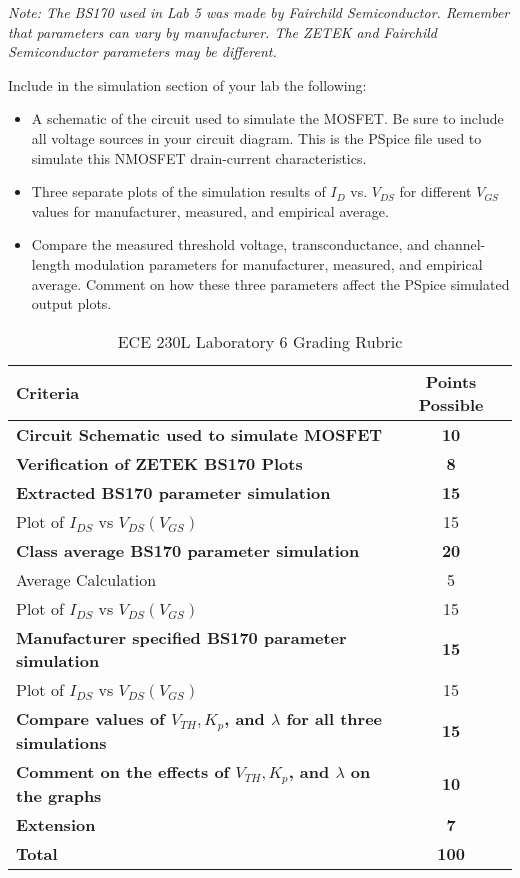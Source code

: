 \documentclass[12pt]{../manual}
\begin{document}
\textit{Note: The BS170 used in Lab 5 was made by Fairchild Semiconductor. Remember that parameters can vary by manufacturer. The ZETEK and Fairchild Semiconductor parameters may be different.}

Include in the simulation section of your lab the following:
\begin{itemize}
\item A schematic of the circuit used to simulate the MOSFET. Be sure to include all voltage sources in your circuit diagram. This is the PSpice file used to simulate this NMOSFET drain-current characteristics.
\item Three separate plots of the simulation results of $I_D$ vs. $V_{DS}$ for different $V_{GS}$ values for manufacturer, measured, and empirical average.
\item Compare the measured threshold voltage, transconductance, and channel-length modulation parameters for manufacturer, measured, and empirical average. Comment on how these three parameters affect the PSpice simulated output plots.
\end{itemize}

%
\newpage
\def\arraystretch{1.2}
{}
\hspace{0pt}
\vfill %
\begin{table}[ht!]
\caption{ECE 230L Laboratory 6 Grading Rubric}
\centering
\begin{tabular}{l|c} \hline
Criteria & Points Possible \\ \hline \hline
\textbf{Circuit Schematic used to simulate MOSFET}	& \textbf{10} \\ \hline
\textbf{Verification of ZETEK BS170 Plots}			& \textbf{8} \\ \hline
\textbf{Extracted BS170 parameter simulation}		& \textbf{15} \\
Plot of $I_{DS}$ vs $V_{DS}(V_{GS})$ 				& 15 \\ \hline
\textbf{Class average BS170 parameter simulation}	& \textbf{20} \\
Average Calculation									& 5 \\ 
Plot of $I_{DS}$ vs $V_{DS}(V_{GS})$ 				& 15 \\ \hline
\textbf{Manufacturer specified BS170 parameter simulation}		& \textbf{15} \\
Plot of $I_{DS}$ vs $V_{DS}(V_{GS})$ 				& 15 \\ \hline
\textbf{Compare values of $V_{TH}, K_p$, and $\lambda$ for all three simulations} & \textbf{15} \\ \hline
\textbf{Comment on the effects of $V_{TH}, K_p$, and $\lambda$ on the graphs} & \textbf{10} \\ \hline
{\bf Extension} 									& {\bf 7} \\ \hline \hline
{\bf Total}											& {\bf 100} \\ \hline
\end{tabular}
\end{table}
\vfill %
\end{document}
